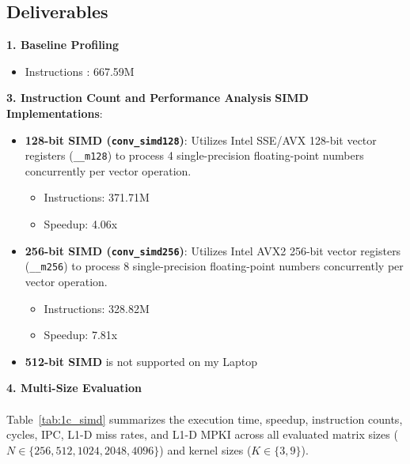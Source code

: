 \documentclass[11pt,a4paper]{article}
\begin{document}
\subsection{Deliverables}
\noindent \textbf{1. Baseline Profiling}
\begin{itemize}
    \item Instructions : 667.59M
        
\end{itemize}
\noindent \textbf{3. Instruction Count and Performance Analysis}
\textbf{SIMD Implementations}:
    \begin{itemize}
        \item \textbf{128-bit SIMD (\texttt{conv\_simd128})}: Utilizes Intel SSE/AVX 128-bit vector registers (\texttt{\_\_m128}) to process 4 single-precision floating-point numbers concurrently per vector operation.
        \begin{itemize}
            \item Instructions: 371.71M
            \item Speedup: 4.06x
        \end{itemize}
        \item \textbf{256-bit SIMD (\texttt{conv\_simd256})}: Utilizes Intel AVX2 256-bit vector registers (\texttt{\_\_m256}) to process 8 single-precision floating-point numbers concurrently per vector operation.
        \begin{itemize}
            \item Instructions: 328.82M
            \item Speedup: 7.81x
        \end{itemize}
        \item \textbf{512-bit SIMD} is not supported on my Laptop
    \end{itemize}


\noindent \textbf{4. Multi-Size Evaluation}\\ \\
Table~\ref{tab:1c_simd} summarizes the execution time, speedup,  instruction counts, cycles, IPC, L1-D miss rates, and L1-D MPKI across all evaluated matrix sizes ($N \in \{256, 512, 1024, 2048, 4096\}$) and kernel sizes ($K \in \{3, 9\}$).
\end{document}
